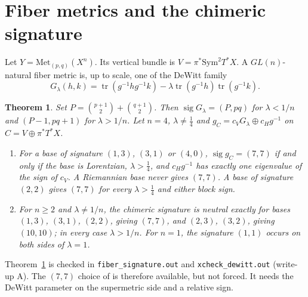 \documentclass[11pt]{article}
\newtheorem{theorem}{Theorem}
\theoremstyle{remark}
\newcommand{\Met}{\mathrm{Met}}
\begin{document}
\section{Fiber metrics and the chimeric signature}
Let $Y=\Met_{(p,q)}(X^n)$. Its vertical bundle is $V=\pi^*\mathrm{Sym}^2T^*X$. A $GL(n)$-natural fiber metric is, up to scale, one of the DeWitt family \cite{DW}
\[ G_\lambda(h,k)=\operatorname{tr}(g^{-1}hg^{-1}k)-\lambda\operatorname{tr}(g^{-1}h)\operatorname{tr}(g^{-1}k). \]
\begin{theorem}\label{thm:sig}
Set $P=\binom{p+1}2+\binom{q+1}2$. Then $\operatorname{sig}G_\lambda=(P,pq)$ for $\lambda<1/n$ and $(P-1,pq+1)$ for $\lambda>1/n$. Let $n=4$, $\lambda\neq\tfrac14$ and $g_C=c_VG_\lambda\oplus c_Hg^{-1}$ on $C=V\oplus\pi^*T^*X$.
\begin{enumerate}
\item For a base of signature $(1,3)$, $(3,1)$ or $(4,0)$, $\operatorname{sig}g_C=(7,7)$ if and only if the base is Lorentzian, $\lambda>\tfrac14$, and $c_Hg^{-1}$ has exactly one eigenvalue of the sign of $c_V$. A Riemannian base never gives $(7,7)$. A base of signature $(2,2)$ gives $(7,7)$ for every $\lambda>\tfrac14$ and either block sign.
\item For $n\ge2$ and $\lambda\neq1/n$, the chimeric signature is neutral exactly for bases $(1,3)$, $(3,1)$, $(2,2)$, giving $(7,7)$, and $(2,3)$, $(3,2)$, giving $(10,10)$; in every case $\lambda>1/n$. For $n=1$, the signature $(1,1)$ occurs on both sides of $\lambda=1$.
\end{enumerate}
\end{theorem}
Theorem~\ref{thm:sig} is checked in \texttt{fiber\_signature.out} and \texttt{xcheck\_dewitt.out} (write-up A). The $(7,7)$ choice of \cite[\S3.5, p.~22]{W21} is therefore available, but not forced. It needs the DeWitt parameter on the supermetric side and a relative sign.
\end{document}
